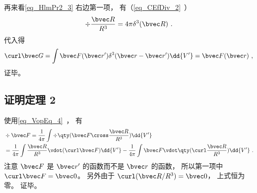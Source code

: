 再来看\autoref{eq_HlmPr2_3} 右边第一项， 有（\autoref{eq_CEfDiv_2}~）
\begin{equation}
\div \frac{\bvec R}{R^3} = 4\pi \delta^3(\bvec R)~.
\end{equation}
代入得
\begin{equation}
\curl \bvec G = \int \bvec F(\bvec r') \delta^3(\bvec r - \bvec r') \dd{V'} = \bvec F(\bvec r)~,
\end{equation}
证毕。

\subsection{证明定理 2}
使用\autoref{eq_VopEq_4}~， 有
\begin{equation}
\begin{aligned}
&\div \bvec F = \frac{1}{4\pi} \int \div \qty(\bvec F \cross \frac{\bvec R}{R^3}) \dd{V'}\\
&= \frac{1}{4\pi} \int \frac{\bvec R}{R^3} \vdot (\curl \bvec F)\dd{V'} - \frac{1}{4\pi} \int \bvec F \vdot \qty(\curl \frac{\bvec R}{R^3})\dd{V'}~.
\end{aligned}
\end{equation}
注意 $\bvec F$ 是 $\bvec r'$ 的函数而不是 $\bvec r$ 的函数， 所以第一项中 $\curl \bvec F = \bvec 0$。 另外由于 $\curl(\bvec R/R^3) = \bvec 0$，%
上式恒为零。 证毕。

